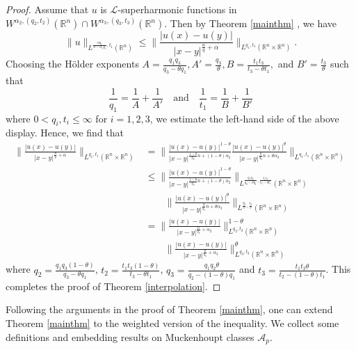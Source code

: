 \documentclass[12pt]{amsart}
\newcommand{\R}{\mathbb{R}}
\numberwithin{equation}{section}
\theoremstyle{plain}
\theoremstyle{definition}
\theoremstyle{remark}
\begin{document}
\begin{proof}
Assume that $u$ is $\mathcal{L}$-superharmonic functions in $W^{\alpha_{2},(q_{2},t_{2})}(\R^{n})\cap W^{\alpha_{3},(q_{3},t_{3})}(\R^{n})$. Then by Theorem \ref{mainthm} , we have 
\[
\|u\|_{L^{\frac{nq_{1}}{n-\alpha_{1} q_{1}},t_{1}}(\R^{n})}\leq \Big\|  \frac{|u(x)-u(y)|}{|x-y|^{\frac{n}{q}+\alpha }} \Big\|_{L^{q_{1},t_{1}}(\R^{n}\times\R^{n})}.
\]
Choosing the H\"{o}lder exponents $A=\frac{q_{1}q_{3}}{q_{3}-\theta q_{1}}, A'=\frac{q_{3}}{\theta}, B=\frac{t_{1}t_{3}}{t_{3}-\theta t_{1}}, $ and $ B'=\frac{t_{3}}{\theta}$ such that
\[
\frac{1}{q_{1}}=\frac{1}{A}+\frac{1}{A'}\quad \text{and}\quad \frac{1}{t_{1}}=\frac{1}{B}+\frac{1}{B'}
\]
where $0<q_{i},t_{i}\leq \infty$ for $i=1,2,3$, we estimate the left-hand side of the above display. Hence, we find that
\begin{align*}
\Big\|  \frac{|u(x)-u(y)|}{|x-y|^{\frac{n}{q}+\alpha }} \Big\|_{L^{q_{1},t_{1}}(\R^{n}\times\R^{n})}&=\Big\|  \frac{|u(x)-u(y)|^{1-\theta}}{|x-y|^{\frac{1-\theta}{q_{2}}n+(1-\theta)\alpha_{2} }} \frac{|u(x)-u(y)|^{\theta}}{|x-y|^{\frac{\theta}{q_{3}}n +\theta\alpha_{3}}}\Big\|_{L^{q_{1}, t_{1}}(\R^{n}\times\R^{n})}\\
&\leq \Big\| \frac{|u(x)-u(y)|^{1-\theta}}{|x-y|^{\frac{1-\theta}{q_{2}}n+(1-\theta)\alpha_{2} }}\Big\|_{L^{\frac{q_{1}q_{3}}{q_{3}-\theta q_{1}},\frac{t_{1}t_{3}}{t_{3}-\theta t_{1}}}(\R^{n}\times\R^{n})}\\
&\qquad\Big\|\frac{|u(x)-u(y)|^{\theta}}{|x-y|^{\frac{\theta}{q_{3}}n +\theta\alpha_{3}}}\Big\|_{L^{\frac{q_{3}}{\theta},\frac{t_{3}}{\theta }}(\R^{n}\times\R^{n})}\\
&= \Big\| \frac{|u(x)-u(y)|}{|x-y|^{\frac{n}{q_{2}}+\alpha_{2} }}\Big\|^{1-\theta}_{L^{q_{2},t_{2}}(\R^{n}\times\R^{n})} \\
&\qquad\Big\| \frac{|u(x)-u(y)|}{|x-y|^{\frac{n}{q_{3}}+\alpha_{3} }}\Big\|^{\theta}_{L^{q_{3},t_{3}}(\R^{n}\times\R^{n})}
\end{align*}
where $q_{2}=\frac{q_{1}q_{3}(1-\theta)}{q_{3}-\theta q_{1}}$, $t_{2}=\frac{t_{1}t_{3}(1-\theta)}{t_{3}-\theta t_{1}}$, $q_{3}=\frac{q_{1}q_{2}\theta}{q_{2}-(1-\theta)q_{1}}$ and $t_{3}=\frac{t_{1}t_{2}\theta}{t_{2}-(1-\theta)t_{1}}$.
This completes the proof of Theorem \ref{interpolation}.
\end{proof}

Following the arguments in the proof of Theorem \ref{mainthm}, one can extend Theorem \ref{mainthm}  to the weighted version of the inequality.
We collect some definitions and embedding results on Muckenhoupt classes $\mathcal{A}_{p}$.
\end{document}
